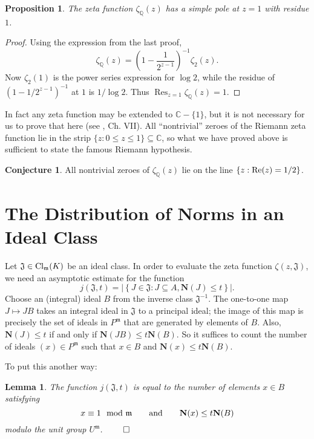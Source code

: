 \documentclass{amsart}
\def\QQ{{\mathbb Q}}
\def\CC{{\mathbb C}}
\def\mf{\mathfrak}
\def\CC{\mathbb{C}}   %
\def\Cl{\textnormal{Cl}}
\def\bN{\textbf{N}}
\newcommand\Res{\operatorname{Res}}
\def\Re{\textnormal{Re}}
\newtheorem{lemma}[theorem]{Lemma}
\newtheorem{proposition}[theorem]{Proposition}
\theoremstyle{definition}
\newtheorem{conjecture}[theorem]{Conjecture}
\theoremstyle{remark}
\begin{document}
\begin{proposition}
The zeta function $\zeta_\QQ(z)$ has a simple pole at $z = 1$
with residue $1$.
\end{proposition}
\begin{proof}
Using the expression from the last proof,
\[
\zeta_\QQ(z) = \left(1 - \frac{1}{2^{z-1}} \right)^{-1}
\zeta_2(z).
\]
Now $\zeta_2(1)$ is the power series expression for $\log 2$,
while the residue of $\left(1 - 1/2^{z-1} \right)^{-1}$ at $1$ is
$1 / \log 2$.  Thus $\Res_{z = 1} \zeta_\QQ(z) = 1$.
\end{proof}
In fact any zeta function may be extended to $\CC - \{ 1 \}$, but
it is not necessary for us to prove that here (see
\cite{neukirch}, Ch. VII).  All ``nontrivial'' zeroes of the
Riemann zeta function lie in the strip $\{ z: 0 \leq z \leq 1 \}
\subseteq \CC$, so what we have proved above is sufficient to
state the famous Riemann hypothesis.
\begin{conjecture}
All nontrivial zeroes of $\zeta_\QQ (z)$ lie on the line $\{ z :
\Re(z) = 1/2 \}$.
\end{conjecture}

\section{The Distribution of Norms in an Ideal Class}

\label{distribution}

Let $\mf{J} \in \Cl_\mf{m}(K)$ be an ideal class. In order to
evaluate the zeta function $\zeta(z, \mf{J})$, we need an
asymptotic estimate for the function
\[
j(\mf{J}, t) = \left| \left\{ J \in \mf{J} : J \subseteq A, \bN(J)
\leq t \right\} \right|.
\]
Choose an (integral) ideal $B$ from the inverse class
$\mf{J}^{-1}$. The one-to-one map $J \mapsto JB$ takes an integral
ideal in $\mf{J}$ to a principal ideal; the image of this map is
precisely the set of ideals in $P^\mf{m}$ that are generated by
elements of $B$.  Also, $\bN(J) \leq t$ if and only if $\bN(JB)
\leq t\bN(B)$.  So it suffices to count the number of ideals $(x)
\in P^\mf{m}$ such that $x \in B$ and $\bN(x) \leq t \bN(B)$.

To put this another way:
\begin{lemma}
\label{anotherway} The function $j(\mf{J}, t)$ is equal to the
number of elements $x \in B$ satisfying
\[
x \equiv 1 \mod \mf{m} \quad \quad \textnormal{and} \quad \quad
\bN(x) \leq t\bN(B)
\]
modulo the unit group $U^\mf{m}$.  $\qed$
\end{lemma}
\end{document}
